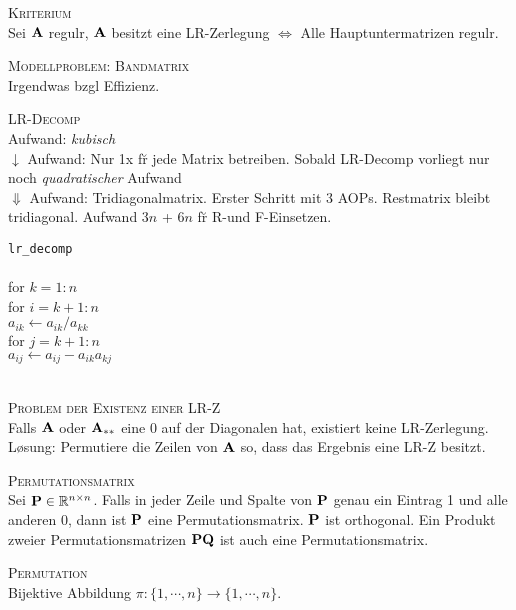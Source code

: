 \textsc{Kriterium}\\
Sei $\mbox{\bf A}$ regul\a r, $\mbox{\bf A}$ besitzt eine LR-Zerlegung $\Leftrightarrow$ Alle Hauptuntermatrizen regul\a r.\vspace{0.2cm}

\textsc{Modellproblem: Bandmatrix}\\
Irgendwas bzgl Effizienz.\vspace{0.2cm}

\textsc{LR-Decomp}\\
Aufwand: \emph{kubisch} \\
$\downarrow$ Aufwand: Nur 1x f\u r jede Matrix betreiben. Sobald LR-Decomp vorliegt nur noch \emph{quadratischer} Aufwand \\ 
$\Downarrow$ Aufwand: Tridiagonalmatrix. Erster Schritt mit 3 AOPs. Restmatrix bleibt tridiagonal. Aufwand $3n$ + $6n$ f\u r R-und F-Einsetzen.\vspace{0.2cm}

\verb!lr_decomp!\\
{\addtolength{\leftskip}{0mm}
\hrulefill\\
for $k=1:n$\\
\quad for $i=k+1:n$ \\ 
\qquad $a_{ik} \leftarrow a_{ik}/a_{kk}$ \\
\qquad for $j=k+1:n$\\
\qquad\quad $a_{ij} \leftarrow a_{ij}-a_{ik}a_{kj}$\\
\hrulefill\\
}\vspace{0.2cm}

\textsc{Problem der Existenz einer LR-Z}\\
Falls $\mbox{\bf A}$ oder $\mbox{\bf A}_{**}$ eine 0 auf der Diagonalen hat, existiert keine LR-Zerlegung. L\o sung: Permutiere die Zeilen von $\mbox{\bf A}$ so, dass das Ergebnis eine LR-Z besitzt.\vspace{0.2cm}

\textsc{Permutationsmatrix}\\
Sei $\mbox{\bf P} \in \mathbb{R}^{n \times n}$. Falls in jeder Zeile und Spalte von $\mbox{\bf P}$ genau ein Eintrag 1 und alle anderen 0, dann ist $\mbox{\bf P}$ eine Permutationsmatrix. $\mbox{\bf P}$ ist orthogonal. Ein Produkt zweier Permutationsmatrizen $\mbox{\bf P}\mbox{\bf Q}$ ist auch eine Permutationsmatrix.\vspace{0.2cm}

\textsc{Permutation}\\
Bijektive Abbildung $\pi : \{1,\cdots,n\} \rightarrow \{1,\cdots,n\}$.\vspace{0.2cm}

